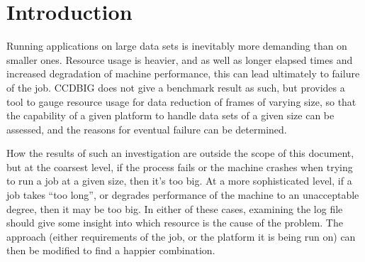 \stardocabstract
 \begin{latexonly}
   \setlength{\parskip}{0mm}
   \latexonlytoc
   \setlength{\parskip}{\medskipamount}
   \markright{\stardocname}
 \end{latexonly}
\newpage
\renewcommand{\thepage}{\arabic{page}}
\setcounter{page}{1}




\newcommand{\KAPPAref}{\xref{KAPPA}{sun95}{}}
\newcommand{\CCDPref}{\xref{CCDPACK}{sun139}{}}
\newcommand{\GWMref}{\xref{GWM}{sun130}{}}
\newcommand{\KAPPAcmd}[1]{\xref{#1}{sun95}{#1}}
\newcommand{\CCDPcmd}[1]{\xref{#1}{sun139}{#1}}




\section{Introduction}

Running applications on large data sets 
is inevitably more demanding than on smaller ones.
Resource usage is heavier, and as well as longer 
elapsed times and increased degradation of machine performance, 
this can lead ultimately to failure of the job. 
CCDBIG does not give a benchmark result as such,
but provides a tool to gauge resource usage 
for data reduction of frames of varying size,
so that the capability of a given platform to handle data sets
of a given size can be assessed, 
and the reasons for eventual failure can be determined.

How the results of such an investigation are outside the
scope of this document,
but at the coarsest level, if the process fails or the machine crashes
when trying to run a job at a given size, then it's too big. 
At a more sophisticated level, if a job takes ``too long'',
or degrades performance of the machine to an unacceptable degree,
then it may be too big. 
In either of these cases, examining the log file should give some 
insight into which resource is the cause of the problem.
The approach (either requirements of the job,
or the platform it is being run on) can then be modified
to find a happier combination.

